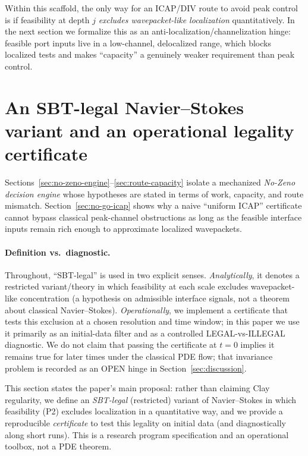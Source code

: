 \documentclass[11pt]{article}
\begin{document}
Within this scaffold, the only way for an ICAP/DIV route to avoid peak control is if
feasibility at depth $j$ \emph{excludes wavepacket-like localization} quantitatively.
In the next section we formalize this as an anti-localization/channelization hinge:
feasible port inputs live in a low-channel, delocalized range, which blocks localized tests and
makes ``capacity'' a genuinely weaker requirement than peak control.
 \section{An SBT-legal Navier--Stokes variant and an operational legality certificate}
\label{sec:spt-legal}

Sections~\ref{sec:no-zeno-engine}--\ref{sec:route-capacity} isolate a mechanized
\emph{No-Zeno decision engine} whose hypotheses are stated in terms of work, capacity,
and route mismatch. Section~\ref{sec:no-go-icap} shows why a naive ``uniform ICAP''
certificate cannot bypass classical peak-channel obstructions as long as the feasible
interface inputs remain rich enough to approximate localized wavepackets.

\paragraph{Definition vs.\ diagnostic.}
Throughout, ``SBT-legal'' is used in two explicit senses.
\emph{Analytically}, it denotes a restricted variant/theory in which feasibility at each scale excludes
wavepacket-like concentration (a hypothesis on admissible interface signals, not a theorem about
classical Navier--Stokes).
\emph{Operationally}, we implement a certificate that tests this exclusion at a chosen resolution and
time window; in this paper we use it primarily as an initial-data filter and as a controlled
LEGAL-vs-ILLEGAL diagnostic.
We do not claim that passing the certificate at $t=0$ implies it remains true for later times under
the classical PDE flow; that invariance problem is recorded as an OPEN hinge in
Section~\ref{sec:discussion}.

This section states the paper's main proposal: rather than claiming Clay regularity,
we define an \emph{SBT-legal} (restricted) variant of Navier--Stokes in which feasibility
(P2) excludes localization in a quantitative way, and we provide a reproducible
\emph{certificate} to test this legality on initial data (and diagnostically along short
runs). This is a research program specification and an operational toolbox, not a PDE theorem.
\end{document}
